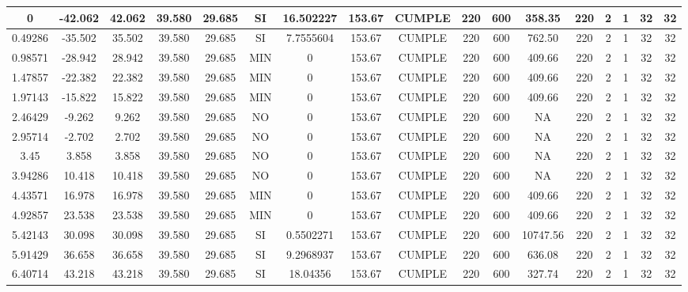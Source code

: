 \begin{table}[H]
{\begin{tabular}{|c|c|c|c|c|c|c|c|c|c|c|c|c|c|c|c|c|}
        
    \hline
    0   & -42.062 & 42.062 & 39.580 & 29.685 & SI  & 16.502227 & 153.67 & CUMPLE & 220 & 600 & 358.35 & 220 & 2   & 1   & 32  & 32 \bigstrut\\
    \hline
    0.49286 & -35.502 & 35.502 & 39.580 & 29.685 & SI  & 7.7555604 & 153.67 & CUMPLE & 220 & 600 & 762.50 & 220 & 2   & 1   & 32  & 32 \bigstrut\\
    \hline
    0.98571 & -28.942 & 28.942 & 39.580 & 29.685 & MIN & 0   & 153.67 & CUMPLE & 220 & 600 & 409.66 & 220 & 2   & 1   & 32  & 32 \bigstrut\\
    \hline
    1.47857 & -22.382 & 22.382 & 39.580 & 29.685 & MIN & 0   & 153.67 & CUMPLE & 220 & 600 & 409.66 & 220 & 2   & 1   & 32  & 32 \bigstrut\\
    \hline
    1.97143 & -15.822 & 15.822 & 39.580 & 29.685 & MIN & 0   & 153.67 & CUMPLE & 220 & 600 & 409.66 & 220 & 2   & 1   & 32  & 32 \bigstrut\\
    \hline
    2.46429 & -9.262 & 9.262 & 39.580 & 29.685 & NO  & 0   & 153.67 & CUMPLE & 220 & 600 & NA  & 220 & 2   & 1   & 32  & 32 \bigstrut\\
    \hline
    2.95714 & -2.702 & 2.702 & 39.580 & 29.685 & NO  & 0   & 153.67 & CUMPLE & 220 & 600 & NA  & 220 & 2   & 1   & 32  & 32 \bigstrut\\
    \hline
    3.45 & 3.858 & 3.858 & 39.580 & 29.685 & NO  & 0   & 153.67 & CUMPLE & 220 & 600 & NA  & 220 & 2   & 1   & 32  & 32 \bigstrut\\
    \hline
    3.94286 & 10.418 & 10.418 & 39.580 & 29.685 & NO  & 0   & 153.67 & CUMPLE & 220 & 600 & NA  & 220 & 2   & 1   & 32  & 32 \bigstrut\\
    \hline
    4.43571 & 16.978 & 16.978 & 39.580 & 29.685 & MIN & 0   & 153.67 & CUMPLE & 220 & 600 & 409.66 & 220 & 2   & 1   & 32  & 32 \bigstrut\\
    \hline
    4.92857 & 23.538 & 23.538 & 39.580 & 29.685 & MIN & 0   & 153.67 & CUMPLE & 220 & 600 & 409.66 & 220 & 2   & 1   & 32  & 32 \bigstrut\\
    \hline
    5.42143 & 30.098 & 30.098 & 39.580 & 29.685 & SI  & 0.5502271 & 153.67 & CUMPLE & 220 & 600 & 10747.56 & 220 & 2   & 1   & 32  & 32 \bigstrut\\
    \hline
    5.91429 & 36.658 & 36.658 & 39.580 & 29.685 & SI  & 9.2968937 & 153.67 & CUMPLE & 220 & 600 & 636.08 & 220 & 2   & 1   & 32  & 32 \bigstrut\\
    \hline
    6.40714 & 43.218 & 43.218 & 39.580 & 29.685 & SI  & 18.04356 & 153.67 & CUMPLE & 220 & 600 & 327.74 & 220 & 2   & 1   & 32  & 32 \bigstrut\\

\end{tabular}}
\end{table}

